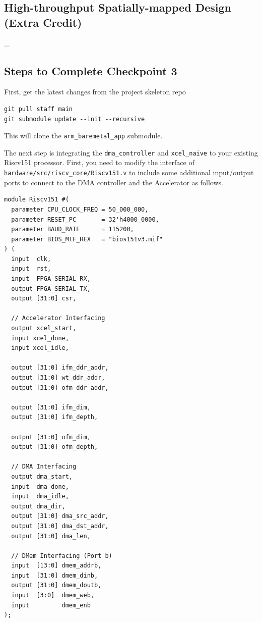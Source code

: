 \documentclass[11pt]{article}
\begin{document}
\subsection{High-throughput Spatially-mapped Design (Extra Credit)}

...

\subsection{Steps to Complete Checkpoint 3}

First, get the latest changes from the project skeleton repo

\begin{verbatim}
git pull staff main
git submodule update --init --recursive
\end{verbatim}

This will clone the \verb|arm_baremetal_app| submodule.

The next step is integrating the \texttt{dma\_controller} and \texttt{xcel\_naive} to your existing Riscv151 processor.
First, you need to modify the interface of \verb|hardware/src/riscv_core/Riscv151.v| to include some additional input/output ports to connect to the DMA controller and the Accelerator as follows.

\begin{verbatim}
module Riscv151 #(
  parameter CPU_CLOCK_FREQ = 50_000_000,
  parameter RESET_PC       = 32'h4000_0000,
  parameter BAUD_RATE      = 115200,
  parameter BIOS_MIF_HEX   = "bios151v3.mif"
) (
  input  clk,
  input  rst,
  input  FPGA_SERIAL_RX,
  output FPGA_SERIAL_TX,
  output [31:0] csr,

  // Accelerator Interfacing
  output xcel_start,
  input xcel_done,
  input xcel_idle,

  output [31:0] ifm_ddr_addr,
  output [31:0] wt_ddr_addr,
  output [31:0] ofm_ddr_addr,

  output [31:0] ifm_dim,
  output [31:0] ifm_depth,

  output [31:0] ofm_dim,
  output [31:0] ofm_depth,

  // DMA Interfacing
  output dma_start,
  input  dma_done,
  input  dma_idle,
  output dma_dir,
  output [31:0] dma_src_addr,
  output [31:0] dma_dst_addr,
  output [31:0] dma_len,

  // DMem Interfacing (Port b)
  input  [13:0] dmem_addrb,
  input  [31:0] dmem_dinb,
  output [31:0] dmem_doutb,
  input  [3:0]  dmem_web,
  input         dmem_enb
);
\end{verbatim}
\end{document}

